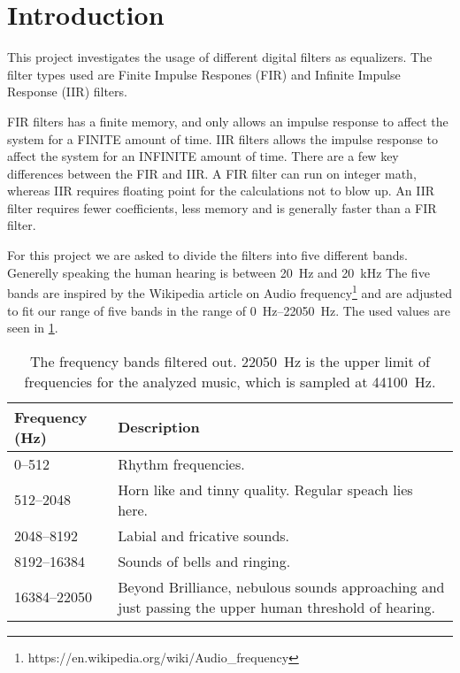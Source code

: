 
\section{Introduction}
This project investigates the usage of different digital filters as equalizers. The filter types used are Finite Impulse Respones (FIR) and Infinite Impulse Response (IIR) filters.

FIR filters has a finite memory, and only allows an impulse response to affect the system for a FINITE amount of time.
IIR filters allows the impulse response to affect the system for an INFINITE amount of time.
There are a few key differences between the FIR and IIR.
A FIR filter can run on integer math, whereas IIR requires floating point for the calculations not to blow up.
An IIR filter requires fewer coefficients, less memory and is generally faster than a FIR filter.

For this project we are asked to divide the filters into five different bands. Generelly speaking the human hearing is between \SI{20}{\hertz} and \SI{20}{\kilo\hertz} The five bands are inspired by the Wikipedia article on Audio frequency\footnote{https://en.wikipedia.org/wiki/Audio\_frequency} and are adjusted to fit our range of five bands in the range of \SIrange{0}{22050}{\hertz}. The used values are seen in \cref{tab:FiveBand}.

\begin{table}[h]
	\caption{The frequency bands filtered out. \SI{22050}{\hertz} is the upper limit of frequencies for the analyzed music, which is sampled at \SI{44100}{\hertz}.}
	\label{tab:FiveBand}
	\begin{tabularx}{\textwidth}{X X}
		\textbf{Frequency} (\si{\hertz})	& \textbf{Description} \\
		\midrule
		\numrange{0}{512}		& Rhythm frequencies. \\
		\numrange{512}{2048}	& Horn like and tinny quality. Regular speach lies here. \\
		\numrange{2048}{8192}	& Labial and fricative sounds. \\
		\numrange{8192}{16384}	& Sounds of bells and ringing. \\
		\numrange{16384}{22050} & 	Beyond Brilliance, nebulous sounds approaching and just passing the upper human threshold of hearing. \\
	\end{tabularx}
\end{table}

